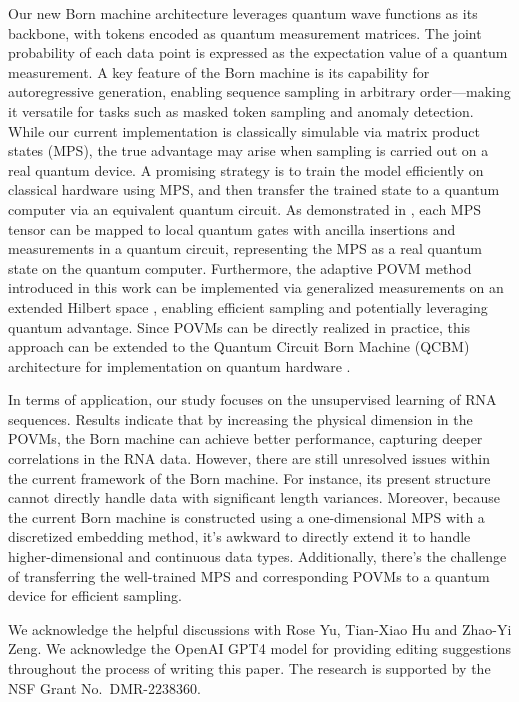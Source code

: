 Our new Born machine architecture leverages quantum wave functions as its backbone, with tokens encoded as quantum measurement matrices. The joint probability of each data point is expressed as the expectation value of a quantum measurement. A key feature of the Born machine is its capability for autoregressive generation, enabling sequence sampling in arbitrary order—making it versatile for tasks such as masked token sampling and anomaly detection. While our current implementation is classically simulable via matrix product states (MPS), the true advantage may arise when sampling is carried out on a real quantum device. A promising strategy is to train the model efficiently on classical hardware using MPS, and then transfer the trained state to a quantum computer via an equivalent quantum circuit. As demonstrated in \cite{2022PhRvX..12a1047H, 2024QS&T....9a5012R}, each MPS tensor can be mapped to local quantum gates with ancilla insertions and measurements in a quantum circuit, representing the MPS as a real quantum state on the quantum computer. Furthermore, the adaptive POVM method introduced in this work can be implemented via generalized measurements on an extended Hilbert space \cite{preskill1998lecture}, enabling efficient sampling and potentially leveraging quantum advantage. Since POVMs can be directly realized in practice, this approach can be extended to the Quantum Circuit Born Machine (QCBM) architecture for implementation on quantum hardware \cite{PhysRevA.98.062324, 2019npjQI...5...45B}.

In terms of application, our study focuses on the unsupervised learning of RNA sequences. Results indicate that by increasing the physical dimension in the POVMs, the Born machine can achieve better performance, capturing deeper correlations in the RNA data. However, there are still unresolved issues within the current framework of the Born machine. For instance, its present structure cannot directly handle data with significant length variances. Moreover, because the current Born machine is constructed using a one-dimensional MPS with a discretized embedding method, it's awkward to directly extend it to handle higher-dimensional and continuous data types. Additionally, there's the challenge of transferring the well-trained MPS and corresponding POVMs to a quantum device for efficient sampling.

\begin{acknowledgments}
We acknowledge the helpful discussions with Rose Yu, Tian-Xiao Hu and Zhao-Yi Zeng. 
We acknowledge the OpenAI GPT4 model for providing editing suggestions throughout the process of writing this paper. The research is supported by the NSF Grant No.~DMR-2238360.
\end{acknowledgments}


